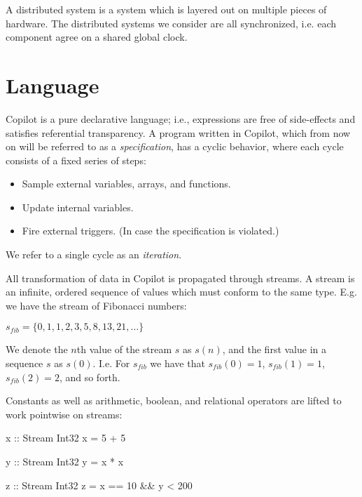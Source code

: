 \documentclass[]{article}
\theoremstyle{example}
\begin{document}
A distributed system is a system which is layered out on multiple pieces of hardware.
The distributed systems we consider are all synchronized, i.e. each component agree on
a shared global clock.

\section{Language}

Copilot is a pure declarative language; i.e., expressions are free of side-effects
and satisfies referential transparency.
A program written in Copilot, which from now on will be referred to as a \emph{specification},
has a cyclic behavior, where each cycle consists of a fixed series of steps:

\begin{itemize}
\item Sample external variables, arrays, and functions.
\item Update internal variables.
\item Fire external triggers. (In case the specification is violated.)
\end{itemize}

\noindent We refer to a single cycle as an \emph{iteration}.

All transformation of data in Copilot is propagated through streams.
A stream is an infinite, ordered sequence of values which must conform to the same type.
E.g. we have the stream of Fibonacci numbers:

\begin{center}
$s_{fib} = \{0, 1, 1, 2, 3, 5, 8, 13, 21, \dots \}$
\end{center}

\noindent We denote the $n$th value of the stream $s$ as $s(n)$, and the first
value in a sequence $s$ as $s(0)$. I.e. For $s_{fib}$ we have that $s_{fib}(0) = 1$,
$s_{fib}(1) = 1$, $s_{fib}(2) = 2$, and so forth.

Constants as well as arithmetic, boolean, and relational operators are
lifted to work pointwise on streams:
\\

\noindent
\begin{minipage}{0.3\textwidth}
\begin{code}
x :: Stream Int32
x = 5 + 5
\end{code}
\end{minipage}
\begin{minipage}{0.3\textwidth}
\begin{code}
y :: Stream Int32
y = x * x
\end{code}
\end{minipage}
\begin{minipage}{0.3\textwidth}
\begin{code}
z :: Stream Int32
z = x == 10 && y < 200
\end{code}
\end{minipage}
\\
\end{document}

